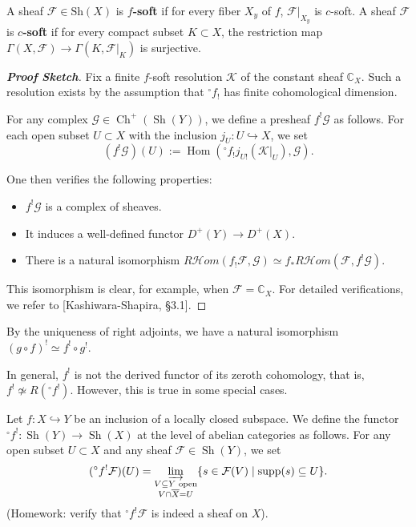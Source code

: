 \begin{remark}
    A sheaf $\mathcal{F}\in\mathrm{Sh}(X)$ is \textbf{$f$-soft} if for every fiber $X_y$ of $f$, $\mathcal{F}|_{X_y}$ is $c$-soft. 
    A sheaf $\mathcal{F}$ is \textbf{$c$-soft} if for every compact subset $K \subset X$, the restriction map $\Gamma(X, \mathcal{F}) \to \Gamma(K, \mathcal{F}|_K)$ is surjective.
\end{remark}

\begin{proof}[\textbf{Proof Sketch}]
Fix a finite $f$-soft resolution $\mathcal{K}$ of the constant sheaf $\mathbb{C}_X$. 
Such a resolution exists by the assumption that $^\circ f_!$ has finite cohomological dimension.

For any complex $\mathcal{G} \in \operatorname{Ch}^+(\operatorname{Sh}(Y))$, we define a presheaf $f^!\mathcal{G}$ as follows. For each open subset $U \subset X$ with the inclusion $j_U \colon U \hookrightarrow X$, we set
\begin{equation*}
    (f^!\mathcal{G})(U) := \operatorname{Hom}(^\circ f_! j_{U!} (\mathcal{K}|_U), \mathcal{G}).
\end{equation*}

One then verifies the following properties:
\begin{itemize}
    \item $f^!\mathcal{G}$ is a complex of sheaves.
    \item It induces a well-defined functor $D^+(Y) \to D^+(X)$.
    \item There is a natural isomorphism $R\mathcal{H}om(f_!\mathcal{F}, \mathcal{G}) \simeq f_* R\mathcal{H}om(\mathcal{F}, f^!\mathcal{G})$.
\end{itemize}
This isomorphism is clear, for example, when $\mathcal{F} = \mathbb{C}_X$. For detailed verifications, we refer to [Kashiwara-Shapira, \S 3.1].
\end{proof}

By the uniqueness of right adjoints, we have a natural isomorphism $(g \circ f)^! \simeq f^! \circ g^!$.

\begin{remark}
In general, $f^!$ is not the derived functor of its zeroth cohomology, that is, $f^! \not\simeq R(^\circ f^!)$.
However, this is true in some special cases.
\end{remark}

\begin{example}
Let $f \colon X \hookrightarrow Y$ be an inclusion of a locally closed subspace. We define the functor $^\circ f^! \colon \operatorname{Sh}(Y) \to \operatorname{Sh}(X)$ at the level of abelian categories as follows. For any open subset $U \subset X$ and any sheaf $\mathcal{F} \in \operatorname{Sh}(Y)$, we set
\begin{equation*}
    (^\circ f^!\mathcal{F})(U) = \varinjlim_{\substack{V \subseteq Y \text{ open} \\ V \cap \overline{X} = U}} \{ s \in \mathcal{F}(V) \mid \operatorname{supp}(s) \subseteq U \}.
\end{equation*}
(Homework: verify that $^\circ f^!\mathcal{F}$ is indeed a sheaf on $X$).
\end{example}

